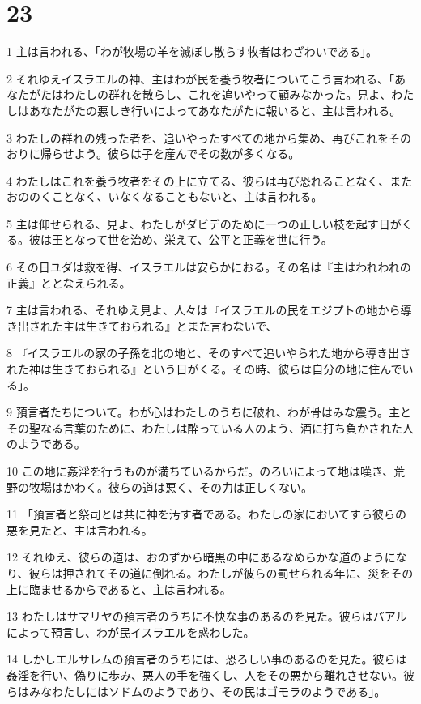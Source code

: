 \chapter{23}

\par 1 主は言われる、「わが牧場の羊を滅ぼし散らす牧者はわざわいである」。
\par 2 それゆえイスラエルの神、主はわが民を養う牧者についてこう言われる、「あなたがたはわたしの群れを散らし、これを追いやって顧みなかった。見よ、わたしはあなたがたの悪しき行いによってあなたがたに報いると、主は言われる。
\par 3 わたしの群れの残った者を、追いやったすべての地から集め、再びこれをそのおりに帰らせよう。彼らは子を産んでその数が多くなる。
\par 4 わたしはこれを養う牧者をその上に立てる、彼らは再び恐れることなく、またおののくことなく、いなくなることもないと、主は言われる。
\par 5 主は仰せられる、見よ、わたしがダビデのために一つの正しい枝を起す日がくる。彼は王となって世を治め、栄えて、公平と正義を世に行う。
\par 6 その日ユダは救を得、イスラエルは安らかにおる。その名は『主はわれわれの正義』ととなえられる。
\par 7 主は言われる、それゆえ見よ、人々は『イスラエルの民をエジプトの地から導き出された主は生きておられる』とまた言わないで、
\par 8 『イスラエルの家の子孫を北の地と、そのすべて追いやられた地から導き出された神は生きておられる』という日がくる。その時、彼らは自分の地に住んでいる」。
\par 9 預言者たちについて。わが心はわたしのうちに破れ、わが骨はみな震う。主とその聖なる言葉のために、わたしは酔っている人のよう、酒に打ち負かされた人のようである。
\par 10 この地に姦淫を行うものが満ちているからだ。のろいによって地は嘆き、荒野の牧場はかわく。彼らの道は悪く、その力は正しくない。
\par 11 「預言者と祭司とは共に神を汚す者である。わたしの家においてすら彼らの悪を見たと、主は言われる。
\par 12 それゆえ、彼らの道は、おのずから暗黒の中にあるなめらかな道のようになり、彼らは押されてその道に倒れる。わたしが彼らの罰せられる年に、災をその上に臨ませるからであると、主は言われる。
\par 13 わたしはサマリヤの預言者のうちに不快な事のあるのを見た。彼らはバアルによって預言し、わが民イスラエルを惑わした。
\par 14 しかしエルサレムの預言者のうちには、恐ろしい事のあるのを見た。彼らは姦淫を行い、偽りに歩み、悪人の手を強くし、人をその悪から離れさせない。彼らはみなわたしにはソドムのようであり、その民はゴモラのようである」。

